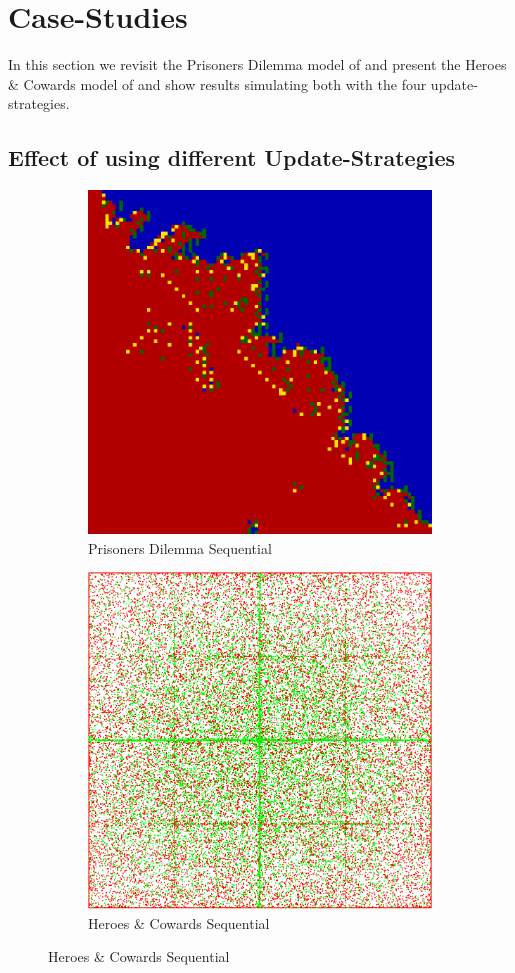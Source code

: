 \section{Case-Studies}
In this section we revisit the Prisoners Dilemma model of \cite{nowak_evolutionary_1992} and present the Heroes \& Cowards model of \cite{wilensky_introduction_2015} and show results simulating both with the four update-strategies. 

\subsection{Effect of using different Update-Strategies}
\begin{figure}

	\centering
	
    \begin{subfigure}[b]{0.4\textwidth}
		\centering
       	\includegraphics[width=.7\textwidth, angle=0]{./fig/seq_99x99_436steps_MSG_haskell.png}
        \caption{Prisoners Dilemma Sequential}
        \label{fig:pd_seq}
    \end{subfigure}
    \begin{subfigure}[b]{0.4\textwidth}
    	\centering
        \includegraphics[width=.7\textwidth, angle=0]{./fig/seq_HAC_100_000_500steps_java.png}
        \caption{Heroes \& Cowards Sequential}
        \label{fig:hac_seq}
    \end{subfigure}
       


\end{figure}
